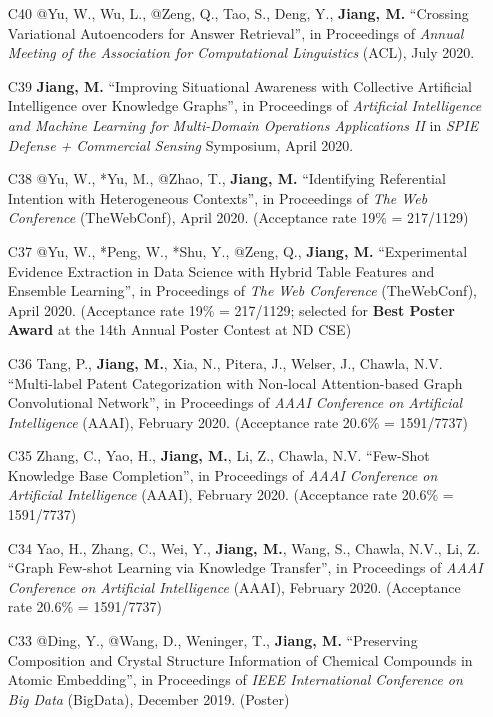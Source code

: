 \documentclass[10pt]{article}
\newenvironment{myindentpar}[1]%
{\begin{list}{}%
         {\setlength{\leftmargin}{#1}}%
         \item[]%
}
{\end{list}}
\newcounter{list}
\begin{document}
\begin{myindentpar}{0.00cm}
\begin{enumerate}[leftmargin=.5cm]
\item[C40] @Yu, W., Wu, L., @Zeng, Q., Tao, S., Deng, Y., \textbf{Jiang, M.} ``Crossing Variational Autoencoders for Answer Retrieval'', in Proceedings of \textit{Annual Meeting of the Association for Computational Linguistics} (ACL), July 2020.

\item[C39] \textbf{Jiang, M.} ``Improving Situational Awareness with Collective Artificial Intelligence over Knowledge Graphs'', in Proceedings of \textit{Artificial Intelligence and Machine Learning for Multi-Domain Operations Applications II} in \textit{SPIE Defense + Commercial Sensing} Symposium, April 2020.

\item[C38] @Yu, W., *Yu, M., @Zhao, T., \textbf{Jiang, M.} ``Identifying Referential Intention with Heterogeneous Contexts'', in Proceedings of \textit{The Web Conference} (TheWebConf), April 2020. (Acceptance rate 19\% = 217/1129)

\item[C37] @Yu, W., *Peng, W., *Shu, Y., @Zeng, Q., \textbf{Jiang, M.} ``Experimental Evidence Extraction in Data Science with Hybrid Table Features and Ensemble Learning'', in Proceedings of \textit{The Web Conference} (TheWebConf), April 2020. (Acceptance rate 19\% = 217/1129; selected for \textbf{Best Poster Award} at the 14th Annual Poster Contest at ND CSE)

\item[C36] Tang, P., \textbf{Jiang, M.}, Xia, N., Pitera, J., Welser, J., Chawla, N.V. ``Multi-label Patent Categorization with Non-local Attention-based Graph Convolutional Network'', in Proceedings of \textit{AAAI Conference on Artificial Intelligence} (AAAI), February 2020. (Acceptance rate 20.6\% = 1591/7737)
	
\item[C35] Zhang, C., Yao, H., \textbf{Jiang, M.}, Li, Z., Chawla, N.V. ``Few-Shot Knowledge Base Completion'', in Proceedings of \textit{AAAI Conference on Artificial Intelligence} (AAAI), February 2020. (Acceptance rate 20.6\% = 1591/7737)

\item[C34] Yao, H., Zhang, C., Wei, Y., \textbf{Jiang, M.}, Wang, S., Chawla, N.V., Li, Z. ``Graph Few-shot Learning via Knowledge Transfer'', in Proceedings of \textit{AAAI Conference on Artificial Intelligence} (AAAI), February 2020. (Acceptance rate 20.6\% = 1591/7737)

\item[C33] @Ding, Y., @Wang, D., Weninger, T., \textbf{Jiang, M.} ``Preserving Composition and Crystal Structure Information of Chemical Compounds in Atomic Embedding'', in Proceedings of \textit{IEEE International Conference on Big Data} (BigData), December 2019. (Poster)


\end{enumerate}
\end{myindentpar}
\end{document}
